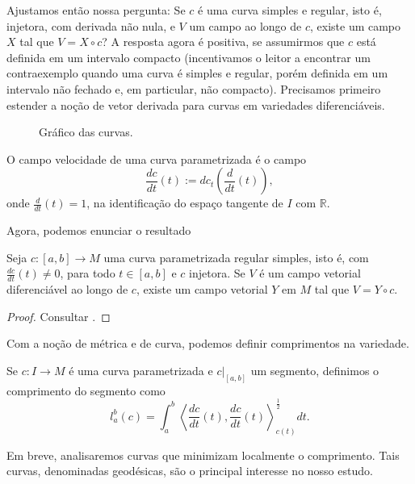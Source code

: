 Ajustamos então nossa pergunta: Se $c$ é uma curva simples e regular, isto é, injetora, com derivada não nula, e $V$ um campo ao longo de $c$, existe um campo $X$ tal que $V=X \circ c$? A resposta agora é positiva, se assumirmos que $c$ está definida em um intervalo compacto (incentivamos o leitor a encontrar um contraexemplo quando uma curva é simples e regular, porém definida em um intervalo não fechado e, em particular, não compacto). Precisamos primeiro estender a noção de vetor derivada para curvas em variedades diferenciáveis.

\begin{figure}[H]
	\centering
	
	\caption{Gráfico das curvas.}
\end{figure}

\begin{definition}
	\label{def:campo-velocidade}
	O campo velocidade de uma curva parametrizada é o campo
	\begin{equation*}
		\frac{dc}{dt}(t) :=dc_{t}\left( \frac{d}{dt}(t) \right),
	\end{equation*}
	onde $\frac{d}{dt}(t)=1$, na identificação do espaço tangente de $I$ com $\mathbb{R}$.
\end{definition}
Agora, podemos enunciar o resultado
\begin{theorem}
	\label{teo:extensao-campo-ao-longo-de-curva}
	Seja $c:[a,b]\to M$ uma curva parametrizada regular simples, isto é, com $\frac{dc}{dt}(t)\neq0$, para todo $t \in [a,b]$ e $c$  injetora. Se $V$ é um campo vetorial diferenciável ao longo de $c$, existe um campo vetorial $Y$ em $M$ tal que $V=Y \circ c$.
	\begin{proof}
		Consultar \textcite{leeRiemannian}. %
	\end{proof}
\end{theorem}
Com a noção de métrica e de curva, podemos definir comprimentos na variedade.
\begin{definition}
	\label{def:comprimento-de-curva}
	Se $c:I\to M$ é uma curva parametrizada e $c|_{[a,b]}$ um segmento, definimos o comprimento do segmento como
	\begin{equation*}
		l_{a}^{b}(c)=\int_{a}^{b}\left<\frac{dc}{dt}(t),\frac{dc}{dt}(t)\right>_{c(t)}^{\frac{1}{2}}dt.
	\end{equation*}
\end{definition}
Em breve, analisaremos curvas que minimizam localmente o comprimento. Tais curvas, denominadas geodésicas, são o principal interesse no nosso estudo.

